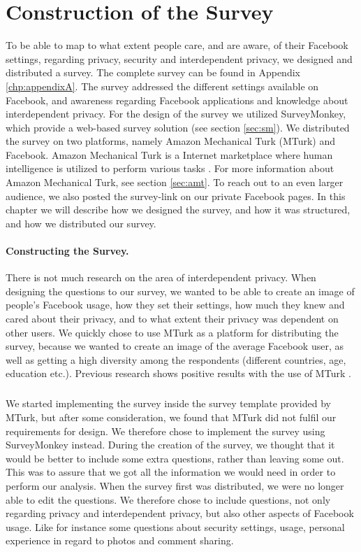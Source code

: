 \chapter{Construction of the Survey}
\label{chp:amtsurvey} 

To be able to map to what extent people care, and are aware, of their Facebook settings, regarding privacy, security and interdependent privacy, we designed and distributed a survey. The complete survey can be found in Appendix \ref{chp:appendixA}. The survey addressed the different settings available on Facebook, and awareness regarding Facebook applications and knowledge about interdependent privacy. For the design of the survey we utilized SurveyMonkey, which provide a web-based survey solution (see section \ref{sec:sm}). We distributed the survey on two platforms, namely Amazon Mechanical Turk (MTurk) and Facebook. Amazon Mechanical Turk is a Internet marketplace where human intelligence is utilized to perform various tasks \cite{amazonweb}. For more information about Amazon Mechanical Turk, see section \ref{sec:amt}. To reach out to an even larger audience, we also posted the survey-link on our private Facebook pages. In this chapter we will describe how we designed the survey, and how it was structured, and how we distributed our survey.


\subsubsection{Constructing the Survey.}
There is not much research on the area of interdependent privacy. When designing the questions to our survey, we wanted to be able to create an image of people's Facebook usage, how they set their settings, how much they knew and cared about their privacy, and to what extent their privacy was dependent on other users. We quickly chose to use MTurk as a platform for distributing the survey, because we wanted to create an image of the average Facebook user, as well as getting a high diversity among the respondents (different countries, age, education etc.). Previous research shows positive results with the use of MTurk \cite{expectations,incentivesAmt}. 

\paragraph{}
We started implementing the survey inside the survey template provided by MTurk, but after some consideration, we found that MTurk did not fulfil our requirements for design. We therefore chose to implement the survey using SurveyMonkey instead. During the creation of the survey, we thought that it would be better to include some extra questions, rather than leaving some out. This was to assure that we got all the information we would need in order to perform our analysis. When the survey first was distributed, we were no longer able to edit the questions. We therefore chose to include questions, not only regarding privacy and interdependent privacy, but also other aspects of Facebook usage. Like for instance some questions about security settings, usage, personal experience in regard to photos and comment sharing.

